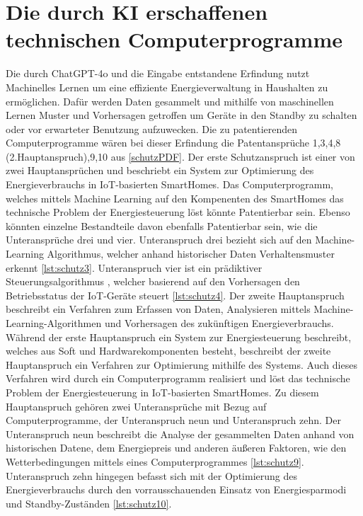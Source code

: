 \section{Die durch KI erschaffenen technischen Computerprogramme}
Die durch ChatGPT-4o und die Eingabe entstandene Erfindung nutzt Machinelles Lernen um eine effiziente
Energieverwaltung in Haushalten zu ermöglichen. 
Dafür werden Daten gesammelt und mithilfe von maschinellen Lernen Muster 
und Vorhersagen getroffen um Geräte in den Standby zu schalten 
oder vor erwarteter Benutzung aufzuwecken. 
Die zu patentierenden Computerprogramme wären bei dieser Erfindung die
Patentansprüche 1,3,4,8 (2.Hauptanspruch),9,10 aus \ref{schutzPDF}. 
Der erste Schutzanspruch ist einer von zwei Hauptansprüchen 
und beschriebt ein System zur Optimierung des Energieverbrauchs in IoT-basierten SmartHomes.
Das Computerprogramm, welches mittels Machine Learning
auf den Kompenenten des SmartHomes das technische Problem
der Energiesteuerung löst könnte Patentierbar sein.
Ebenso könnten einzelne Bestandteile davon ebenfalls Patentierbar sein,
wie die Unteransprüche drei und vier.
Unteranspruch drei bezieht sich auf den Machine-Learning Algorithmus,
welcher anhand historischer Daten Verhaltensmuster erkennt \ref{lst:schutz3}. 
Unteranspruch vier ist ein prädiktiver Steuerungsalgorithmus ,
welcher basierend auf den Vorhersagen 
den Betriebsstatus der IoT-Geräte steuert \ref{lst:schutz4}.
Der zweite Hauptanspruch beschreibt ein Verfahren zum Erfassen von Daten, 
Analysieren mittels Machine-Learning-Algorithmen 
und Vorhersagen des zukünftigen Energieverbrauchs. 
Während der erste Hauptanspruch ein System zur
Energiesteuerung beschreibt, welches aus 
Soft und Hardwarekomponenten besteht, 
beschreibt der zweite Hauptanspruch ein Verfahren zur Optimierung 
mithilfe des Systems. Auch dieses Verfahren wird durch ein 
Computerprogramm realisiert und löst das technische Problem 
der Energiesteuerung in IoT-basierten SmartHomes.
Zu diesem Hauptanspruch gehören zwei Unteransprüche mit Bezug auf 
Computerprogramme, der Unteranspruch neun und Unteranspruch zehn.
Der Unteranspruch neun beschreibt die Analyse der gesammelten
Daten anhand von historischen Datene, dem Energiepreis 
und anderen äußeren Faktoren, wie den Wetterbedingungen mittels
eines Computerprogrammes \ref{lst:schutz9}. 
Unteranspruch zehn hingegen befasst sich mit der Optimierung 
des Energieverbrauchs durch den vorrausschauenden 
Einsatz von Energiesparmodi und Standby-Zuständen \ref{lst:schutz10}.

